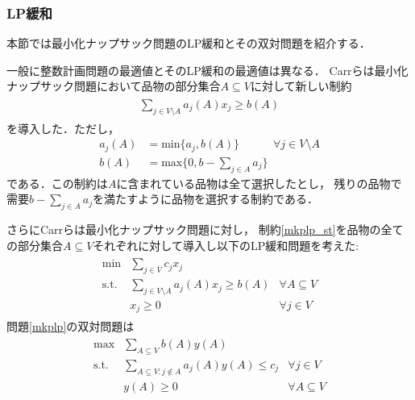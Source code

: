 \documentclass[11pt,dvipdfmx]{jarticle}
\numberwithin{equation}{section}
\begin{document}
        \subsubsection{LP緩和}
            本節では最小化ナップサック問題のLP緩和とその双対問題を紹介する．\par
            一般に整数計画問題の最適値とそのLP緩和の最適値は異なる．
            Carrら\cite{int_gap}は最小化ナップサック問題において品物の部分集合$A\subseteq V$に対して新しい制約
            \begin{align}
                \begin{array}{cll}
                    \displaystyle\sum_{j\in V\setminus A}{a_j(A)x_j}\ge b(A)
                \end{array}
                \label{mkplp_st}
            \end{align}
            を導入した．ただし，
            \begin{subequations}
                \begin{align}
                    a_j(A) &= \mathrm{min}\{a_j, b(A)\} \qquad\quad\forall j\in V\setminus A \label{kci_a}\\
                    b(A) &= \mathrm{max}\{0, b-\displaystyle\sum_{j\in A}{a_j}\}\label{kci_b}
                \end{align}
            \end{subequations}
            である．この制約は$A$に含まれている品物は全て選択したとし，
            残りの品物で需要$b-\sum_{j\in A}{a_j}$を満たすように品物を選択する制約である．\par
            さらにCarrらは最小化ナップサック問題に対し，
            制約\eqref{mkplp_st}を品物の全ての部分集合$A\subseteq V$それぞれに対して導入し以下のLP緩和問題を考えた:
            \begin{align}
                \begin{array}{cll}
                    \mathrm{min } & \displaystyle\sum_{j\in V}{c_jx_j} \\
                    \mathrm{s.t.} & \displaystyle\sum_{j\in V\setminus A}{a_j(A)x_j}\ge b(A) & \forall A\subseteq V \\
                            & x_j \ge 0 & \forall j\in V 
                \end{array}
                \label{mkplp}
            \end{align}
            問題\eqref{mkplp}の双対問題は
            \begin{align}
                \begin{array}{cll}
                    \mathrm{max } & \displaystyle\sum_{A\subseteq V}{b(A)y(A)}\\
                    \mathrm{s.t.} & \displaystyle\sum_{A\subseteq V:j\notin A}{a_j(A)y(A)}\le c_j &\forall j\in V\\
                                & y(A)\ge0 &\forall A \subseteq V
                \end{array}
                \label{mkpd}
            \end{align}
\end{document}
